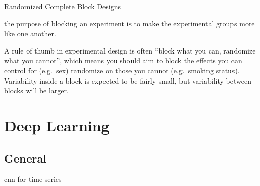\documentclass[]{book}
\begin{document}
Randomized Complete Block Designs

the purpose of blocking an experiment is to make the experimental groups
more like one another.

A rule of thumb in experimental design is often ``block what you can,
randomize what you cannot'', which means you should aim to block the
effects you can control for (e.g.~sex) randomize on those you cannot
(e.g.~smoking status). Variability inside a block is expected to be
fairly small, but variability between blocks will be larger.

\chapter{Deep Learning}\label{deep-learning}

\section{General}\label{general-5}

cnn for time series
\end{document}
